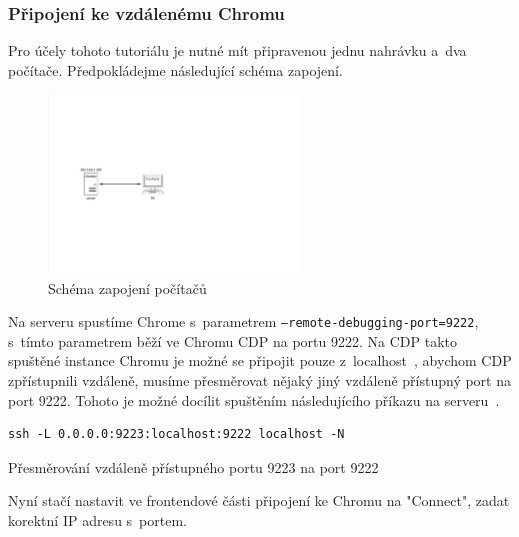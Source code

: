 \documentclass[12pt, a4paper, twoside]{article}
\newcommand{\codefigureSpacing}{1.2}
\begin{document}
	\subsubsection{Připojení ke vzdálenému Chromu}
	\label{subsub_sec:remoteChrome}
	Pro účely tohoto tutoriálu je nutné mít připravenou jednu nahrávku a~dva počítače. Předpokládejme následující schéma zapojení. 
	\begin{figure}[H]
		\centering
		\includegraphics[width=0.6\textwidth]{remoteConnectionSchema.pdf}
		\caption{Schéma zapojení počítačů}
	\end{figure}
	Na serveru spustíme Chrome s~parametrem \texttt{--remote-debugging-port=9222}, s~tímto parametrem běží ve Chromu CDP na portu 9222. Na CDP takto spuštěné instance Chromu je možné se připojit pouze z~localhost~\cite{devtoolsProtocol}, abychom CDP zpřístupnili vzdáleně, musíme přesměrovat nějaký jiný vzdáleně přístupný port na port 9222. Tohoto je možné docílit spuštěním následujícího příkazu na serveru~\cite{enableTrueRemoteDebuggingChrome}.
	\nopagebreak
	\begin{codefigure}[H]
		\renewcommand\baselinestretch{\codefigureSpacing}
		\begin{lstlisting}[style=MyHTML]
ssh -L 0.0.0.0:9223:localhost:9222 localhost -N
		\end{lstlisting}
		\caption{Přesměrování vzdáleně přístupného portu 9223 na port 9222}
	\end{codefigure}
	Nyní stačí nastavit ve frontendové části připojení ke Chromu na "Connect", zadat korektní IP adresu s~portem.
\end{document}
